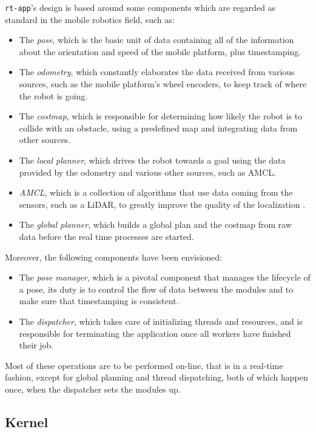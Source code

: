 \documentclass[a4paper,12pt]{report}
\begin{document}
\texttt{rt-app}'s design is based around some components which are regarded as standard in the mobile robotics field, such as:
\begin{itemize}
    \item The \textit{pose}, which is the basic unit of data containing all of the information about the orientation and speed of the mobile platform, plus timestamping.
    \item The \textit{odometry}, which constantly elaborates the data received from various sources, such as the mobile platform's wheel encoders, to keep track of where the robot is going.
    \item The \textit{costmap}, which is responsible for determining how likely the robot is to collide with an obstacle, using a predefined map and integrating data from other sources.
    \item The \textit{local planner}, which drives the robot towards a goal using the data provided by the odometry and various other sources, such as AMCL.
    \item \textit{AMCL}, which is a collection of algorithms that use data coming from the sensors, such as a LiDAR, to greatly improve the quality of the localization \cite{roswiki-amcl}.
    \item The \textit{global planner}, which builds a global plan and the costmap from raw data before the real time processes are started.
\end{itemize}

Moreover, the following components have been envisioned:
\begin{itemize}
  \item The \textit{pose manager}, which is a pivotal component that manages the lifecycle of a pose, its duty is to control the flow of data between the modules and to make sure that timestamping is consistent.
  \item The \textit{dispatcher}, which takes care of initializing threads and resources, and is responsible for terminating the application once all workers have finished their job.
\end{itemize}

Most of these operations are to be performed on-line, that is in a real-time fashion, except for global planning and thread dispatching, both of which happen once, when the dispatcher sets the modules up.

\subsection{Kernel}
\end{document}
